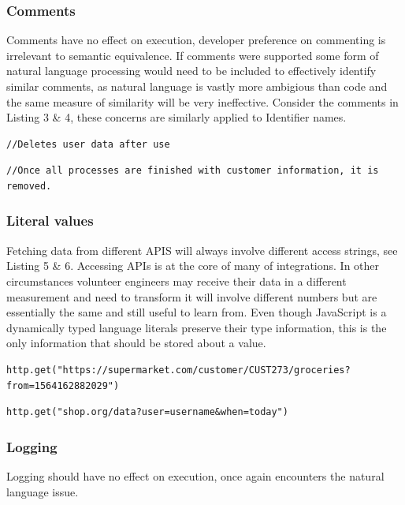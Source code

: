 \documentclass[jou,apacite]{apa6}
\begin{document}
\subsubsection{Comments}
 Comments have no effect on execution, developer preference on commenting is irrelevant to semantic equivalence. If comments were supported some form of natural language processing would need to be included to effectively identify similar comments, as natural language is vastly more ambigious than code and the same measure of similarity will be very ineffective. Consider the comments in Listing 3 \& 4, these concerns are similarly applied to Identifier names.
 
\begin{lstlisting}[caption=Comment semantics - A]
//Deletes user data after use
\end{lstlisting} 

\begin{lstlisting}[caption=Comment semantics- B]
//Once all processes are finished with customer information, it is removed.
\end{lstlisting} 
 
  \subsubsection{Literal values}
Fetching data from different APIS will always involve different access strings, see Listing 5 \& 6. Accessing APIs is at the core of many of integrations. In other circumstances volunteer engineers may receive their data in a different measurement and need to transform it will involve different numbers but are essentially the same and still useful to learn from. Even though JavaScript is a dynamically typed language literals preserve their type information, this is the only information that should be stored about a value.

\begin{lstlisting}[caption=API access string dissimilarity - A]
http.get("https://supermarket.com/customer/CUST273/groceries?from=1564162882029")
\end{lstlisting} 

\begin{lstlisting}[caption=API access string dissimilarity - B]
http.get("shop.org/data?user=username&when=today")
\end{lstlisting} 
\subsubsection{Logging}
Logging should have no effect on execution, once again encounters the natural language issue.
\newline
\end{document}
